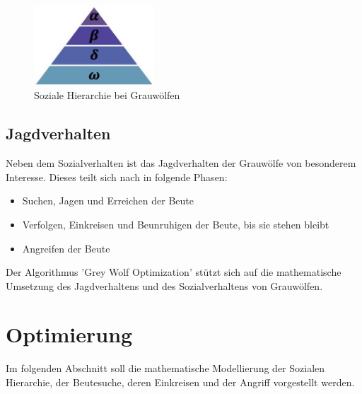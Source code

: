 \begin{figure}[ht]
    \begin{center}
        \includegraphics[width=0.4\textwidth]{assets/img/Grey_wolf_social_hierarchy.jpg}
        \caption[Soziale Hierarchie bei Grauwölfen]{Soziale Hierarchie bei Grauwölfen \cite{MIRJALILI201446}}
        \label{gwo_hierarchy}
    \end{center}
\end{figure}

\subsection{Jagdverhalten}
Neben dem Sozialverhalten ist das Jagdverhalten der Grauwölfe von besonderem Interesse. Dieses teilt sich nach \cite[vgl. Mirjalili 2014, S.5]{MIRJALILI201446} in folgende Phasen: 
\begin{itemize}
    \item Suchen, Jagen und Erreichen der Beute
    \item Verfolgen, Einkreisen und Beunruhigen der Beute, bis sie stehen bleibt
    \item Angreifen der Beute 
\end{itemize}
Der Algorithmus 'Grey Wolf Optimization' stützt sich auf die mathematische Umsetzung des Jagdverhaltens und des Sozialverhaltens von Grauwölfen.

\section{Optimierung}
Im folgenden Abschnitt soll die mathematische Modellierung der Sozialen Hierarchie, der Beutesuche, deren Einkreisen und der Angriff vorgestellt werden.


